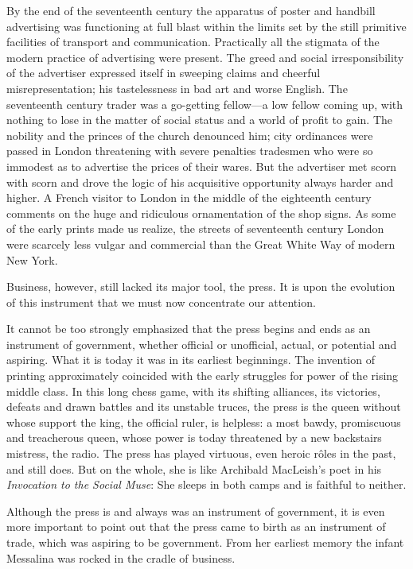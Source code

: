 \documentclass[nohyper,openany,nobib]{tufte-book}
\begin{document}
By the end of the seventeenth century the apparatus of poster and
handbill advertising was functioning at full blast within the limits set
by the still primitive facilities of transport and communication.
Practically all the stigmata of the modern practice of advertising were
present. The greed and social irresponsibility of the advertiser
expressed itself in sweeping claims and cheerful misrepresentation; his
tastelessness in bad art and worse English. The seventeenth century
trader was a go-getting fellow---a low fellow coming up, with nothing to
lose in the matter of social status and a world of profit to gain. The
nobility and the princes of the church denounced him; city ordinances
were passed in London threatening with severe penalties tradesmen who
were so immodest as to advertise the prices of their wares. But the
advertiser met scorn with scorn and drove the logic of his acquisitive
opportunity always harder and higher. A French visitor to London in the
middle of the eighteenth century comments on the huge and ridiculous
ornamentation of the shop signs. As some of the early prints made us
realize, the streets of seventeenth century London were scarcely less
vulgar and commercial than the Great White Way of modern New York.

Business, however, still lacked its major tool, the press. It is upon
the evolution of this instrument that we must now concentrate our
attention.

It cannot be too strongly emphasized that the press begins and ends as
an instrument of government, whether official or unofficial, actual, or
potential and aspiring. What it is today it was in its earliest
beginnings. The invention of printing approximately coincided with the
early struggles for power of the rising middle class. In this long chess
game, with its shifting alliances, its victories, defeats and drawn
battles and its unstable truces, the press is the queen without whose
support the king, the official ruler, is helpless: a most bawdy,
promiscuous and treacherous queen, whose power is today threatened by a
new backstairs mistress, the radio. The press has played virtuous, even
heroic r\^oles in the past, and still does. But on the whole, she is like
Archibald MacLeish's poet in his \emph{Invocation to the Social Muse}:
She sleeps in both camps and is faithful to neither.

Although the press is and always was an instrument of government, it is
even more important to point out that the press came to birth as an
instrument of trade, which was aspiring to be government. From her
earliest memory the infant Messalina was rocked in the cradle of
business.
\end{document}
